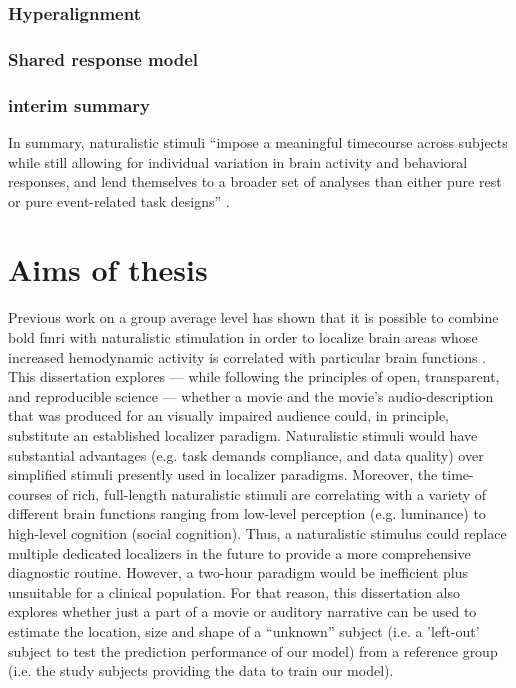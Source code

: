 \subsubsection{Hyperalignment}


\subsubsection{Shared response model}


\subsubsection{interim summary}
In summary, naturalistic stimuli ``impose a meaningful timecourse across
subjects while still allowing for individual variation in brain activity and
behavioral responses, and lend themselves to a broader set of analyses than
either pure rest or pure event-related task designs'' \citep{finn2017can}.



\section{Aims of thesis}

%
Previous work on a group average level has shown that it is possible to combine
\ac{bold} \ac{fmri} with naturalistic stimulation in order to localize brain
areas whose increased hemodynamic activity is correlated with particular brain
functions \citep{bartels2004mapping}.
%
This dissertation explores --- while following the principles of open,
transparent, and reproducible science --- whether a movie and the movie's
audio-description that was produced for an visually impaired audience could, in
principle, substitute an established localizer paradigm.
%
Naturalistic stimuli would have substantial advantages (e.g. task demands
compliance, and data quality) over simplified stimuli presently used in
localizer paradigms.
%
Moreover, the time-courses of rich, full-length naturalistic stimuli are
correlating with a variety of different brain functions ranging from low-level
perception (e.g.  luminance) to high-level cognition (social cognition).
%
Thus, a naturalistic stimulus could replace multiple dedicated localizers in the
future to provide a more comprehensive diagnostic routine.
%
However, a two-hour paradigm would be inefficient plus unsuitable for a clinical
population.
%
For that reason, this dissertation also explores whether just a part of a movie
or auditory narrative can be used to estimate the location, size and shape of a
``unknown'' subject (i.e. a 'left-out' subject to test the prediction
performance of our model) from a reference group (i.e. the study subjects
providing the data to train our model).


